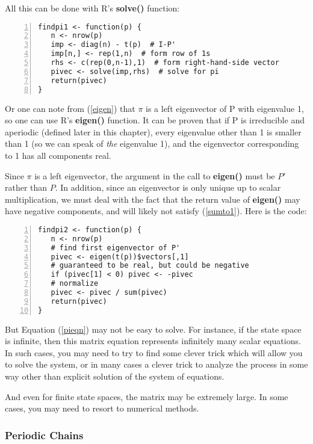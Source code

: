 All this can be done with R's {\bf solve()} function:

\begin{Verbatim}[fontsize=\relsize{-2},numbers=left]
findpi1 <- function(p) {
   n <- nrow(p)
   imp <- diag(n) - t(p)  # I-P'
   imp[n,] <- rep(1,n)  # form row of 1s
   rhs <- c(rep(0,n-1),1)  # form right-hand-side vector
   pivec <- solve(imp,rhs)  # solve for pi
   return(pivec)
}
\end{Verbatim}

Or one can note from (\ref{eigen}) that $\pi$ is a left eigenvector of P
with eigenvalue 1, so one can use R's {\bf eigen()} function.  It can be
proven that if P is irreducible and aperiodic (defined later in this
chapter), every eigenvalue other than 1 is smaller than 1 (so we can
speak of {\it the} eigenvalue 1), and the eigenvector corresponding to 1
has all components real.  

Since $\pi$ is a left eigenvector, the argument in the call to {\bf
eigen()} must be $P'$ 
rather than $P$.  In addition, since an eigenvector is
only unique up to scalar multiplication, we must deal with the fact that
the return value of {\bf eigen()} may have negative components, and will
likely not satisfy (\ref{sumto1}).  Here is the code:

\begin{Verbatim}[fontsize=\relsize{-2},numbers=left]
findpi2 <- function(p) {
   n <- nrow(p)
   # find first eigenvector of P'
   pivec <- eigen(t(p))$vectors[,1]
   # guaranteed to be real, but could be negative
   if (pivec[1] < 0) pivec <- -pivec
   # normalize
   pivec <- pivec / sum(pivec)
   return(pivec)
}
\end{Verbatim}

But Equation (\ref{pieqn}) may not be easy to solve.  For instance, if
the state space is infinite, then this matrix equation represents
infinitely many scalar equations.  In such cases, you may need to try to
find some clever trick which will allow you to solve the system, or in
many cases a clever trick to analyze the process in some way other than
explicit solution of the system of equations.

And even for finite state spaces, the matrix may be extremely large.  In
some cases, you may need to resort to numerical methods. 

\subsubsection{Periodic Chains}

